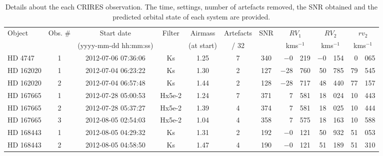 
\begin{table*}
    \small
    \centering
    \begin{threeparttable}[b]
        \caption{Details about the each CRIRES observation. {The time, settings, number of artefacts removed, the SNR obtained and the predicted orbital state of each system are provided.}}
        \begin{tabular}{l c c c c c c r@{.}l r@{.}l r@{.}l}
            \toprule
            Object & Obs. \# & Start date  & Filter & Airmass  & Artefacts & SNR & \multicolumn{2}{c}{\(RV_1\)} & \multicolumn{2}{c}{\(RV_2\)} & \multicolumn{2}{c}{\(rv_2\)}  \\  %
            &   & (yyyy-mm-dd hh:mm:ss)  &  & (at start) & {/ 32} & & \multicolumn{2}{c}{kms\(^{-1}\)} & \multicolumn{2}{c}{kms\(^{-1}\)} & \multicolumn{2}{c}{kms\(^{-1}\)}\\ %
            \midrule
            {HD 4747}   & 1 & 2012-07-06 07:36:06 & Ks     	 & 1.25  	  & 7 & 340 & $-$0    & 219 & $-$0  & 154 & 0&065 \\ %
            {HD 162020} & 1 & 2012-07-04 06:23:22 & Ks     		& 1.30 		& 2 & 127 & $-$28  & 760 & 50 & 785\tnote{a}  & 79&545\tnote{a} \\ %
            {HD 162020} & 2 & 2012-07-04 06:57:48 & Ks     		& 1.44  	& 2 & 128 & $-$28  & 717 & 48 & 440\tnote{a} & 77&157\tnote{a} \\ %
            {HD 167665} & 1 & 2012-07-28 05:00:53 & Hx5e-2 	& 1.24 		& 7 & 371 & 7         & 581 & 18 & 024\tnote{a} & 10&443\tnote{a} \\ %
            {HD 167665} & 2 & 2012-07-28 05:37:27 & Hx5e-2 	& 1.39  	& 4 & 374 & 7         & 581 & 18 & 025\tnote{a} & 10&444\tnote{a} \\ %
            {HD 167665} & 3 & 2012-08-05 02:54:03 & Hx5e-2 	& 1.04  	& 4 & 358 & 7         & 575 & 18 & 163\tnote{a} & 10&588\tnote{a} \\ %
            {HD 168443} & 1 & 2012-08-05 04:29:32 & Ks     		& 1.31 		& 2& 192 & $-$0   & 121 & 50 & 932\tnote{a,b}  & 51&053\tnote{a,b} \\ %
            {HD 168443} & 2 & 2012-08-05 04:58:50 & Ks     		& 1.47 		& 4 & 190 & $-$0   & 121 & 51 & 189\tnote{a,b} & 51&310\tnote{a,b} \\ %

\end{tabular}
\end{threeparttable}
\end{table*}
